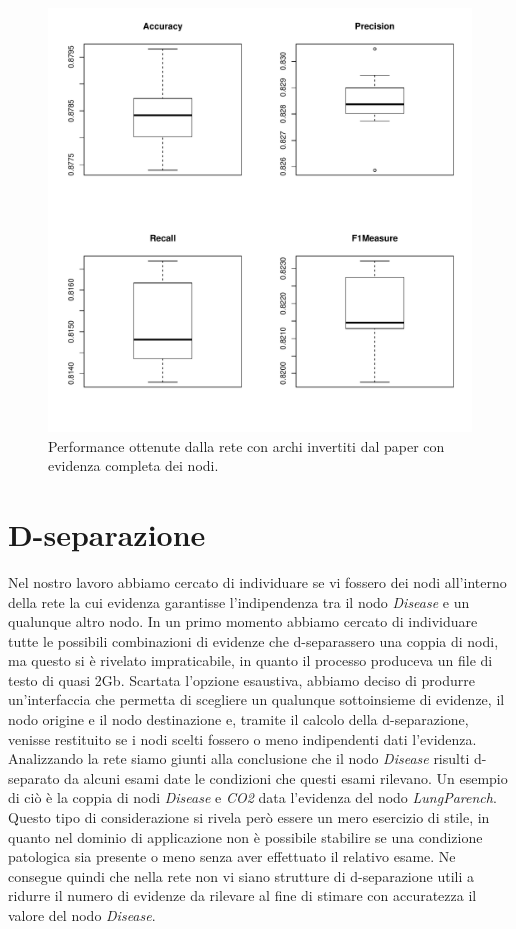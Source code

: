 \begin{figure}
	\centering
	\includegraphics[width=0.7\linewidth]{images/reversed_performance}
	\caption{Performance ottenute dalla rete con archi invertiti dal paper con evidenza completa dei nodi.}
	\label{fig:reversedperformance}
\end{figure}


\section{D-separazione}
Nel nostro lavoro abbiamo cercato di individuare se vi fossero dei nodi all'interno della rete la cui evidenza garantisse l'indipendenza tra il nodo \textit{Disease} e un qualunque altro nodo. In un primo momento abbiamo cercato di individuare tutte le possibili combinazioni di evidenze che d-separassero una coppia di nodi, ma questo si è rivelato impraticabile, in quanto il processo produceva un file di testo di quasi 2Gb. Scartata l'opzione esaustiva, abbiamo deciso di produrre un'interfaccia che permetta di scegliere un qualunque sottoinsieme di evidenze, il nodo origine e il nodo destinazione e, tramite il calcolo della d-separazione, venisse restituito se i nodi scelti fossero o meno indipendenti dati l'evidenza. 
Analizzando la rete siamo giunti alla conclusione che il nodo \textit{Disease} risulti d-separato da alcuni esami date le condizioni che questi esami rilevano. Un esempio di ciò è la coppia di nodi \textit{Disease} e \textit{CO2} data l'evidenza del nodo \textit{LungParench}. Questo tipo di considerazione si rivela però essere un mero esercizio di stile, in quanto nel dominio di applicazione non è possibile stabilire se una condizione patologica sia presente o meno senza aver effettuato il relativo esame. Ne consegue quindi che nella rete non vi siano strutture di d-separazione utili a ridurre il numero di evidenze da rilevare al fine di stimare con accuratezza il valore del nodo \textit{Disease}.

